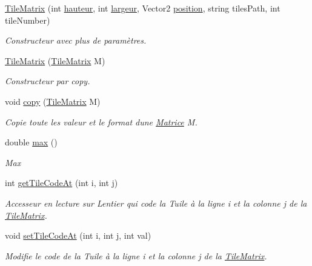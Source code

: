 \begin{DoxyCompactItemize}
\hyperlink{class_tile_matrix_a64f9596f9d73b577fbd3d1df5ee412a8}{Tile\+Matrix} (int \hyperlink{class_tile_matrix_a03b3e21bbee70f916ba6075150d8570b}{hauteur}, int \hyperlink{class_tile_matrix_adbffb02d3f0eba910ccbe6054a776105}{largeur}, Vector2 \hyperlink{class_tile_matrix_ac005af42acbdcf02179ba2514d20f59a}{position}, string tiles\+Path, int tile\+Number)
\begin{DoxyCompactList}\small\item\em Constructeur avec plus de paramètres. \end{DoxyCompactList}\item 
\hyperlink{class_tile_matrix_aa58cf34f960df2c3247fffce1ff53fcf}{Tile\+Matrix} (\hyperlink{class_tile_matrix}{Tile\+Matrix} M)
\begin{DoxyCompactList}\small\item\em Constructeur par copy. \end{DoxyCompactList}\item 
void \hyperlink{class_tile_matrix_a0e990be66abfae5959b5bacb8c3c25c4}{copy} (\hyperlink{class_tile_matrix}{Tile\+Matrix} M)
\begin{DoxyCompactList}\small\item\em Copie toute les valeur et le format d\textquotesingle{}une \hyperlink{class_matrice}{Matrice} M. \end{DoxyCompactList}\item 
double \hyperlink{class_tile_matrix_ab32694c884107298c3bb5fdc0f4622b3}{max} ()
\begin{DoxyCompactList}\small\item\em Max \end{DoxyCompactList}\item 
int \hyperlink{class_tile_matrix_a488170ba429dc466153ae164ed3eb5b7}{get\+Tile\+Code\+At} (int i, int j)
\begin{DoxyCompactList}\small\item\em Accesseur en lecture sur L\textquotesingle{}entier qui code la Tuile à la ligne i et la colonne j de la \hyperlink{class_tile_matrix}{Tile\+Matrix}. \end{DoxyCompactList}\item 
void \hyperlink{class_tile_matrix_aa565334932b2541174e3601bf1fcaa0a}{set\+Tile\+Code\+At} (int i, int j, int val)
\begin{DoxyCompactList}\small\item\em Modifie le code de la Tuile à la ligne i et la colonne j de la \hyperlink{class_tile_matrix}{Tile\+Matrix}. \end{DoxyCompactList}\item 

\end{DoxyCompactItemize}
